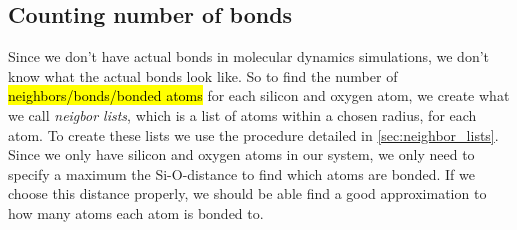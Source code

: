 % 
% 
% 

\subsection{Counting number of bonds}
Since we don't have actual bonds in molecular dynamics simulations, we don't know what the actual bonds look like. So to find the number of \hl{neighbors/bonds/bonded atoms} for each silicon and oxygen atom, we create what we call \emph{neigbor lists}, which is a list of atoms within a chosen radius, for each atom. To create these lists we use the procedure detailed in \cref{sec:neighbor_lists}. Since we only have silicon and oxygen atoms in our system, we only need to specify a maximum the Si-O-distance to find which atoms are bonded. If we choose this distance properly, we should be able find a good approximation to how many atoms each atom is bonded to.


